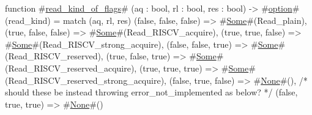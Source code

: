 function #\hyperref[sailRISCVzreadzykindzyofzyflags]{read\_kind\_of\_flags}# (aq : bool, rl : bool, res : bool) -> #\hyperref[sailRISCVzoption]{option}#(read_kind) =
  match (aq, rl, res) {
    (false, false, false) => #\hyperref[sailRISCVzSome]{Some}#(Read_plain),
    (true, false, false)  => #\hyperref[sailRISCVzSome]{Some}#(Read_RISCV_acquire),
    (true, true, false)   => #\hyperref[sailRISCVzSome]{Some}#(Read_RISCV_strong_acquire),
    (false, false, true)  => #\hyperref[sailRISCVzSome]{Some}#(Read_RISCV_reserved),
    (true, false, true)   => #\hyperref[sailRISCVzSome]{Some}#(Read_RISCV_reserved_acquire),
    (true, true, true)    => #\hyperref[sailRISCVzSome]{Some}#(Read_RISCV_reserved_strong_acquire),
    (false, true, false)  => #\hyperref[sailRISCVzNone]{None}#(), /* should these be instead throwing error_not_implemented as below? */
    (false, true, true)   => #\hyperref[sailRISCVzNone]{None}#()
  }
